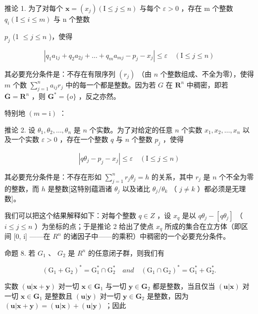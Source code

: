 推论 1. 为了对每个 \(\boldsymbol{x} = (x_{j}) (\mathrm{I} \leqslant j \leqslant n)\) 与每个 \(\varepsilon > 0\) ，存在 m 个整数 \(q_{i} (\mathrm{I} \leqslant i \leqslant m)\) 与 n 个整数

\(p_j\) (1 \(\leqslant j\leqslant n\) )，使得

\[
\left| q _ {1} a _ {1 j} + q _ {2} a _ {2 j} + \dots + q _ {m} a _ {m j} - p _ {j} - x _ {j} \right| \leqslant \varepsilon \quad (\mathrm{I} \leqslant j \leqslant n)
\]

其必要充分条件是：不存在有限序列 \((r_j)\) （由 \(n\) 个整数组成、不全为零），使得 \(m\) 个数 \(\sum_{j=1}^{n} a_{ij} r_j\) 中的每一个都是整数。因为若 \(G\) 在 \(\mathbf{R}^n\) 中稠密，即若 \(\overline{\mathbf{G}} = \mathbf{R}^n\) ，则 \(\mathbf{G}^* = \{o\}\) ，反之亦然。

特别地 \((m = \mathrm{i})\) ：

推论 2. 设 \(\theta_{1},\theta_{2},\ldots ,\theta_{n}\) 是 \(n\) 个实数。为了对给定的任意 \(n\) 个实数 \(x_{1},x_{2},\ldots ,x_{n}\) 以及一个实数 \(\varepsilon >0\) ，存在一个整数 \(q\) 与 \(n\) 个整数 \(p_j\) ，使得

\[
\left| q \theta_ {j} - p _ {j} - x _ {j} \right| \leqslant \varepsilon \quad (\mathrm{I} \leqslant j \leqslant n)
\]

其必要充分条件是：不存在形如 \(\sum_{j=1}^{n} r_j \theta_j = h\) 的关系，其中 \(r_j\) 是 \(n\) 个不全为零的整数，而 \(h\) 是整数{[}这特别蕴涵诸 \(\theta_j\) 以及诸比 \(\theta_j / \theta_k\) （ \(j \neq k\) ）都必须是无理数{]}。

我们可以把这个结果解释如下：对每个整数 \(q \in Z\) ，设 \(x_{q}\) 是以 \(q\theta_{j} - [q\theta_{j}]\) （ \(i \leqslant j \leqslant n\) ）为坐标的点；于是推论 2 给出了使点 \(x_{q}\) 所成的集合在立方体（即区间 {[}0, i{]} ——在 \(R^{n}\) 的诸因子中——的乘积）中稠密的一个必要充分条件。

命题 8. 若 \(G_{1}\) 、 \(G_{2}\) 是 \(R^{n}\) 的任意闭子群，则我们有

\[
(\mathrm{G} _ {1} + \mathrm{G} _ {2}) ^ {*} = \mathrm{G} _ {1} ^ {*} \cap \mathrm{G} _ {2} ^ {*} \quad a n d \quad (\mathrm{G} _ {1} \cap \mathrm{G} _ {2}) ^ {*} = \mathrm{G} _ {1} ^ {*} + \mathrm{G} _ {2} ^ {*}.
\]

实数 \((\pmb{u}|\pmb{x} + \pmb{y})\) 对一切 \(\pmb{x} \in \mathbf{G}_1\) 与一切 \(\pmb{y} \in \mathbf{G}_2\) 都是整数，当且仅当 \((\pmb{u}|\pmb{x})\) 对一切 \(\pmb{x} \in \mathbf{G}_1\) 是整数且 \((\pmb{u}|\pmb{y})\) 对一切 \(\pmb{y} \in \mathbf{G}_2\) 是整数，因为 \((\pmb{u}|\pmb{x} + \pmb{y}) = (\pmb{u}|\pmb{x}) + (\pmb{u}|\pmb{y})\) ；因此


